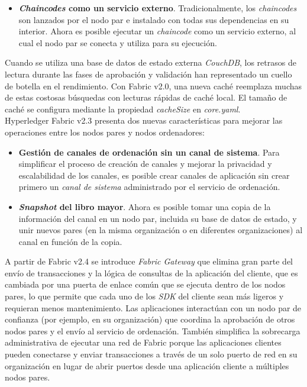 {\begin{itemize}
\item {\bf \emph{Chaincodes} como un servicio externo}. Tradicionalmente, los \emph{chaincodes} son lanzados por el nodo par e instalado con todas sus dependencias en su interior. Ahora es posible ejecutar un \emph{chaincode} como un servicio externo, al cual el nodo par se conecta y utiliza para su ejecuci\'on.
\end{itemize}

Cuando se utiliza una base de datos de estado externa \emph{CouchDB}, los retrasos de lectura durante las fases de aprobaci\'on y validaci\'on han representado un cuello de botella en el rendimiento. Con Fabric v2.0, una nueva cach\'e reemplaza muchas de estas costosas b\'usquedas con lecturas r\'apidas de cach\'e local. El tama\~no de cach\'e se configura mediante la propiedad \emph{cacheSize} en \emph{core.yaml}.\\

Hyperledger Fabric v2.3 presenta dos nuevas caracter\'isticas para mejorar las operaciones entre los nodos pares y nodos ordenadores:

\begin{itemize}
\item {\bf Gesti\'on de canales de ordenaci\'on sin un canal de sistema}. Para simplificar el proceso de creaci\'on de canales y mejorar la privacidad y escalabilidad de los canales, es posible crear canales de aplicaci\'on sin crear primero un \emph{canal de sistema} administrado por el servicio de ordenaci\'on.

\item {\bf \emph{Snapshot} del libro mayor}. Ahora es posible tomar una copia de la informaci\'on del canal en un nodo par, incluida su base de datos de estado, y unir nuevos pares (en la misma organizaci\'on o en diferentes organizaciones) al canal en funci\'on de la copia.
\end{itemize}

A partir de Fabric v2.4 se introduce \emph{Fabric Gateway} que elimina gran parte del env\'io de transacciones y la l\'ogica de consultas de la aplicaci\'on del cliente, que es cambiada por una puerta de enlace com\'un que se ejecuta dentro de los nodos pares, lo que permite que cada uno de los \emph{SDK} del cliente sean m\'as ligeros y requieran menos mantenimiento. Las aplicaciones interact\'uan con un nodo par de confianza (por ejemplo, en su organizaci\'on) que coordina la aprobaci\'on de otros nodos pares y el env\'io al servicio de ordenaci\'on. Tambi\'en simplifica la sobrecarga administrativa de ejecutar una red de Fabric porque las aplicaciones clientes pueden conectarse y enviar transacciones a trav\'es de un solo puerto de red en su organizaci\'on en lugar de abrir puertos desde una aplicaci\'on cliente a m\'ultiples nodos pares.\\

}
